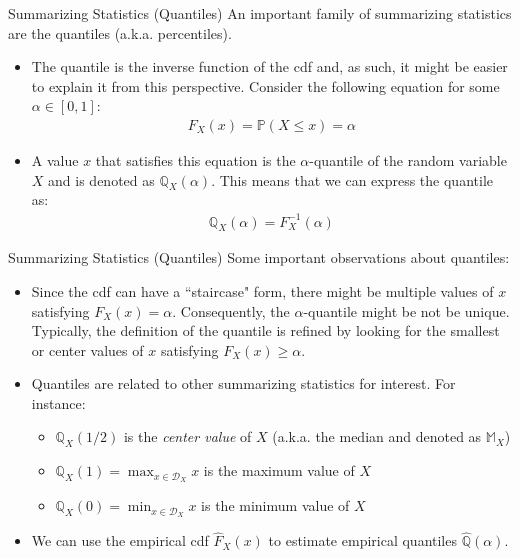 \documentclass[9pt]{beamer}
\begin{document}
%
\begin{frame}{Summarizing Statistics (Quantiles)}
An important family of summarizing statistics are the quantiles (a.k.a. percentiles). 
\begin{block}{}
\begin{itemize}
\item The quantile is the inverse function of the cdf and, as such, it might be easier to explain it from this perspective.  Consider the following equation for some $\alpha \in [0,1]$:
\begin{align*}
F_X(x)=\mathbb{P}(X\leq x)=\alpha 
\end{align*}
\item A value $x$ that satisfies this equation is the $\alpha$-quantile of the random variable $X$ and is denoted as $\mathbb{Q}_X(\alpha)$. This means that we can express the quantile as:
\begin{align*}
\mathbb{Q}_X(\alpha)=F^{-1}_X(\alpha) 
\end{align*}
\end{itemize}
\end{block}
\end{frame}

%
\begin{frame}{Summarizing Statistics (Quantiles)}
Some important observations about quantiles:
\begin{block}{}
\begin{itemize}
\item Since the cdf can have a ``staircase" form, there might be multiple values of $x$ satisfying $F_X(x)=\alpha$. Consequently, the $\alpha$-quantile might be not be unique. Typically,  the definition of the quantile is refined by looking for the smallest or center values of $x$ satisfying $F_X(x)\geq \alpha$. 

\item Quantiles are related to other summarizing statistics for interest. For instance: 
\begin{itemize}
\item $\mathbb{Q}_{X}(1/2)$ is the {\em center value} of $X$ (a.k.a. the median and denoted as $\mathbb{M}_X$)
\item $\mathbb{Q}_X(1)=\max_{x\in \mathcal{D}_X }x$ is the maximum value of $X$
\item $\mathbb{Q}_{X}(0)=\min_{x\in \mathcal{D}_X }x$ is the minimum value of $X$ 
\end{itemize}
\item We can use the empirical cdf $\hat{F}_X(x)$ to estimate empirical quantiles $\hat{\mathbb{Q}}(\alpha)$.
\end{itemize}
\end{block}
\end{frame}
\end{document}
